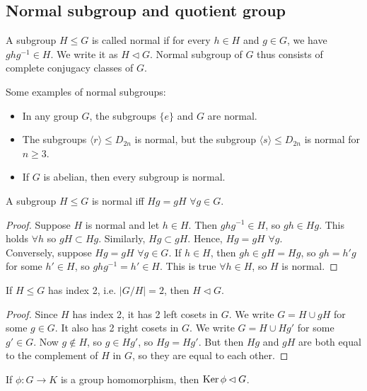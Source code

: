 \documentclass[a4paper]{article}
\begin{document}
\subsection{Normal subgroup and quotient group}
\begin{defi}
A subgroup $H\leq G$ is called normal if for every $h\in H$ and $g\in G$, we have $ghg^{-1}\in H$. We write it as $H\lhd G$. Normal subgroup of $G$ thus consists of complete conjugacy classes of $G$.
\end{defi}
\begin{eg}
Some examples of normal subgroups:
\begin{itemize}
    \item In any group $G$, the subgroups $\{e\}$ and $G$ are normal.
    \item The subgroups $\langle r\rangle\leq D_{2n}$ is normal, but the subgroup $\langle s\rangle\leq D_{2n}$ is normal for $n\geq 3$.
    \item If $G$ is abelian, then every subgroup is normal.
\end{itemize}
\end{eg}
\begin{lemma}
A subgroup $H\leq G$ is normal iff $Hg=gH$ $\forall g\in G$.
\end{lemma}
\begin{proof}
Suppose $H$ is normal and let $h\in H$. Then $ghg^{-1}\in H$, so $gh\in Hg$. This holds $\forall h$ so $gH\subset Hg$. Similarly, $Hg\subset gH$. Hence, $Hg=gH$ $\forall g$.\\[5pt]
Conversely, suppose $Hg=gH$ $\forall g\in G$. If $h\in H$, then $gh\in gH=Hg$, so $gh=h'g$ for some $h'\in H$, so $ghg^{-1}=h'\in H$. This is true $\forall h\in H$, so $H$ is normal.
\end{proof}
\begin{cor}
If $H\leq G$ has index 2, i.e. $|G/H|=2$, then $H\lhd G$.
\end{cor}
\begin{proof}
Since $H$ has index 2, it has 2 left cosets in $G$. We write $G=H\cup gH$ for some $g\in G$. It also has 2 right cosets in $G$. We write $G=H\cup Hg'$ for some $g'\in G$. Now $g\notin H$, so $g\in Hg'$, so $Hg=Hg'$. But then $Hg$ and $gH$ are both equal to the complement of $H$ in $G$, so they are equal to each other.
\end{proof}
\begin{prop}
If $\phi: G\rightarrow K$ is a group homomorphism, then $\operatorname{Ker}\phi\lhd G$.
\end{prop}
\end{document}
